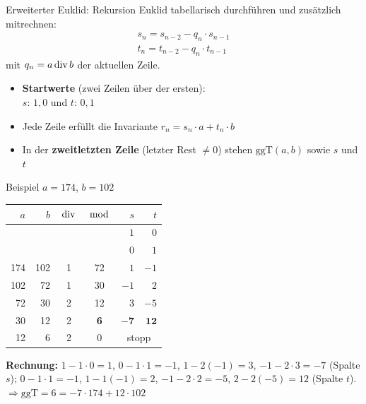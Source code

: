 \documentclass[a4paper, fontsize=7pt]{scrartcl}
\newcommand{\Div}{\mskip3mu\mathrm{div}\mskip3mu}
\newcommand{\Mod}{\mskip3mu\mathrm{mod}\mskip3mu}
\renewcommand*{\arraystretch}{1.5}  %
\begin{document}
\begin{mainbox}{Erweiterter Euklid: Rekursion}
Euklid tabellarisch durchführen und zusätzlich mitrechnen:
\begin{align*}
\boxed{s_n = s_{n-2} - q_n \cdot s_{n-1}}\\
\boxed{t_n = t_{n-2} - q_n \cdot t_{n-1}}
\end{align*}
mit $q_n = a \Div b$ der aktuellen Zeile.
\begin{itemize}
    \item \textbf{Startwerte} (zwei Zeilen über der ersten):\\
          $s$: $1, 0$ \quad und \quad $t$: $0, 1$
    \item Jede Zeile erfüllt die Invariante
          $r_n = s_n \cdot a + t_n \cdot b$
    \item In der \textbf{zweitletzten Zeile} (letzter Rest $\neq 0$) stehen
          $\mathrm{ggT}(a,b)$ sowie $s$ und $t$
\end{itemize}
\end{mainbox}

\begin{subbox}{Beispiel $a=174$, $b=102$}
\renewcommand*{\arraystretch}{1.15}
\begin{center}
\setlength{\tabcolsep}{3pt}
\begin{tabular}{@{}rr|cc|rr@{}}
$a$ & $b$ & $\Div$ & $\Mod$ & $s$ & $t$ \\
\hline
 & & & & $1$ & $0$ \\
 & & & & $0$ & $1$ \\
174 & 102 & 1 & 72 & $1$ & $-1$ \\
102 & 72 & 1 & 30 & $-1$ & $2$ \\
72 & 30 & 2 & 12 & $3$ & $-5$ \\
30 & 12 & 2 & \textbf{6} & $\mathbf{-7}$ & $\mathbf{12}$ \\
12 & 6 & 2 & 0 & \multicolumn{2}{c}{stopp} \\
\end{tabular}
\end{center}
\textbf{Rechnung:} $1-1\cdot 0 = 1$, $0-1\cdot 1 = -1$,
$1-2(-1) = 3$, $-1-2\cdot 3 = -7$ (Spalte $s$);
$0-1\cdot1 = -1$, $1-1(-1) = 2$, $-1-2\cdot2 = -5$,
$2-2(-5) = 12$ (Spalte $t$).\\
$\Rightarrow \mathrm{ggT} = 6 = -7 \cdot 174 + 12 \cdot 102$
\end{subbox}
\end{document}
